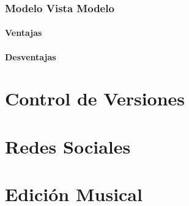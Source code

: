 \subsubsection{Modelo Vista Modelo}
\paragraph{Ventajas}
\paragraph{Desventajas}

\section{Control de Versiones}
\section{Redes Sociales}
\section{Edición Musical}
